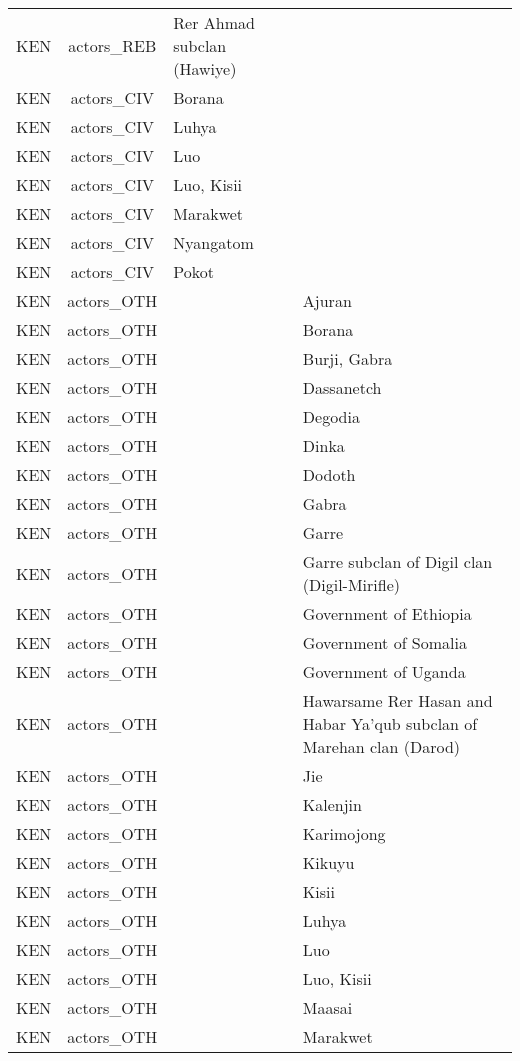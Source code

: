 \documentclass[12pt]{article}
\begin{document}
\begin{center}
\begin{longtable}{|c|c|p{7cm}|p{7cm}|}
  KEN & actors\_REB & Rer Ahmad subclan (Hawiye) &  \\ 
  KEN & actors\_CIV & Borana &  \\ 
  KEN & actors\_CIV & Luhya &  \\ 
  KEN & actors\_CIV & Luo &  \\ 
  KEN & actors\_CIV & Luo, Kisii &  \\ 
  KEN & actors\_CIV & Marakwet &  \\ 
  KEN & actors\_CIV & Nyangatom &  \\ 
  KEN & actors\_CIV & Pokot &  \\ 
  KEN & actors\_OTH &  & Ajuran \\ 
  KEN & actors\_OTH &  & Borana \\ 
  KEN & actors\_OTH &  & Burji, Gabra \\ 
  KEN & actors\_OTH &  & Dassanetch \\ 
  KEN & actors\_OTH &  & Degodia \\ 
  KEN & actors\_OTH &  & Dinka \\ 
  KEN & actors\_OTH &  & Dodoth \\ 
  KEN & actors\_OTH &  & Gabra \\ 
  KEN & actors\_OTH &  & Garre \\ 
  KEN & actors\_OTH &  & Garre subclan of Digil clan (Digil-Mirifle) \\ 
  KEN & actors\_OTH &  & Government of Ethiopia \\ 
  KEN & actors\_OTH &  & Government of Somalia \\ 
  KEN & actors\_OTH &  & Government of Uganda \\ 
  KEN & actors\_OTH &  & Hawarsame Rer Hasan and Habar Ya'qub subclan of Marehan clan (Darod) \\ 
  KEN & actors\_OTH &  & Jie \\ 
  KEN & actors\_OTH &  & Kalenjin \\ 
  KEN & actors\_OTH &  & Karimojong \\ 
  KEN & actors\_OTH &  & Kikuyu \\ 
  KEN & actors\_OTH &  & Kisii \\ 
  KEN & actors\_OTH &  & Luhya \\ 
  KEN & actors\_OTH &  & Luo \\ 
  KEN & actors\_OTH &  & Luo, Kisii \\ 
  KEN & actors\_OTH &  & Maasai \\ 
  KEN & actors\_OTH &  & Marakwet \\ 

\end{longtable}
\end{center}
\end{document}
